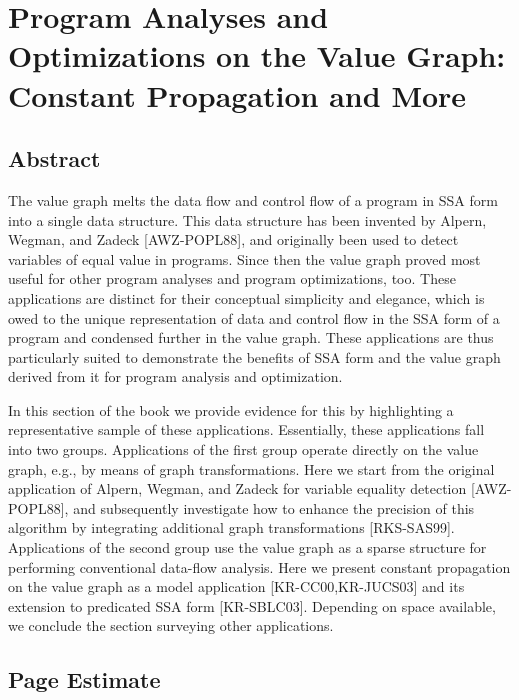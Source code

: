 \chapter*{Program Analyses and Optimizations on the Value Graph: Constant Propagation and More}


\section{Abstract}

The value graph melts the data flow and control flow of a program in
SSA form into a single data structure. This data structure has been
invented by Alpern, Wegman, and Zadeck [AWZ-POPL88], and originally
been used to detect variables of equal value in programs. Since then
the value graph proved most useful for other program analyses and
program optimizations, too. These applications are distinct for their
conceptual simplicity and elegance, which is owed to the unique
representation of data and control flow in the SSA form of a program
and condensed further in the value graph. These applications are thus
particularly suited to demonstrate the benefits of SSA form and the
value graph derived from it for program analysis and optimization.

In this section of the book we provide evidence for this by
highlighting a representative sample of these
applications. Essentially, these applications fall into two
groups. Applications of the first group operate directly on the value
graph, e.g., by means of graph transformations. Here we start from the
original application of Alpern, Wegman, and Zadeck for variable
equality detection [AWZ-POPL88], and subsequently investigate how to
enhance the precision of this algorithm by integrating additional
graph transformations [RKS-SAS99]. Applications of the second group
use the value graph as a sparse structure for performing conventional
data-flow analysis. Here we present constant propagation on the value
graph as a model application [KR-CC00,KR-JUCS03] and its extension to
predicated SSA form [KR-SBLC03]. Depending on space available, we
conclude the section surveying other applications.



\section{Page Estimate}

